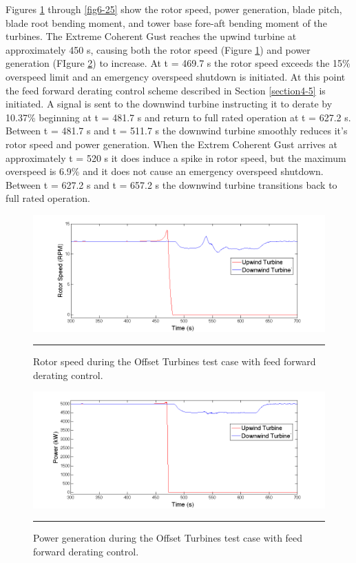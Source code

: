 Figures \ref{fig6-21} through \ref{fig6-25} show the rotor speed, power generation, blade pitch, blade root bending moment, and tower base fore-aft bending moment of the turbines. The Extreme Coherent Gust reaches the upwind turbine at approximately 450 s, causing both the rotor speed (Figure \ref{fig6-21}) and power generation (FIgure \ref{fig6-22}) to increase. At t = 469.7 s the rotor speed exceeds the 15\% overspeed limit and an emergency overspeed shutdown is initiated. At this point the feed forward derating control scheme described in Section \ref{section4-5} is initiated. A signal is sent to the downwind turbine instructing it to derate by 10.37\% beginning at t = 481.7 s and return to full rated operation at t = 627.2 s. Between t = 481.7 s and t = 511.7 s the downwind turbine smoothly reduces it's rotor speed and power generation. When the Extrem Coherent Gust arrives at approximately t = 520 s it does induce a spike in rotor speed, but the maximum overspeed is 6.9\% and it does not cause an emergency overspeed shutdown. Between t = 627.2 s and t = 657.2 s the downwind turbine transitions back to full rated operation.

\begin{figure}[htbp] \label{fig6-21}
	\centering
		\includegraphics[trim = {1cm 0 2cm 0}, clip, width = \linewidth]{Figures/ch6Figures/fig6-21.png}
		\rule{35em}{0.5pt}
	\caption{Rotor speed during the Offset Turbines test case with feed forward derating control.}
\end{figure}
\begin{figure}[htbp] \label{fig6-22}
	\centering
		\includegraphics[trim = {1cm 0 2cm 0}, clip, width = \linewidth]{Figures/ch6Figures/fig6-22.png}
		\rule{35em}{0.5pt}
	\caption{Power generation during the Offset Turbines test case with feed forward derating control.}
\end{figure}

